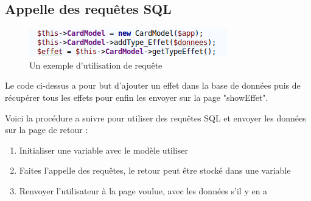 \documentclass[a4paper, titlepage]{livret}
\begin{document}
	\subsection{Appelle des requêtes SQL}
	 \begin{figure}[th]
     		 \begin{center}
        	\includegraphics[scale=0.4]{Assets/requete.png}
       		 \caption{Un exemple d'utilisation de requête}
       		 \label{fig9}
     		 \end{center}
   	 \end{figure}
	
	Le code ci-dessus a pour but d'ajouter un effet dans la base de données puis de récupérer tous les effets pour enfin les envoyer sur la page "showEffet".

	Voici la procédure a suivre pour utiliser des requêtes SQL et envoyer les données sur la page de retour :
	\begin{enumerate}
		\item Initialiser une variable avec le modèle utiliser
		\item Faites l'appelle des requêtes, le retour peut être stocké dans une variable
		\item Renvoyer l'utilisateur à la page voulue, avec les données s'il y en a
	\end{enumerate}
	

      

  \listoffigures  
\end{document}
